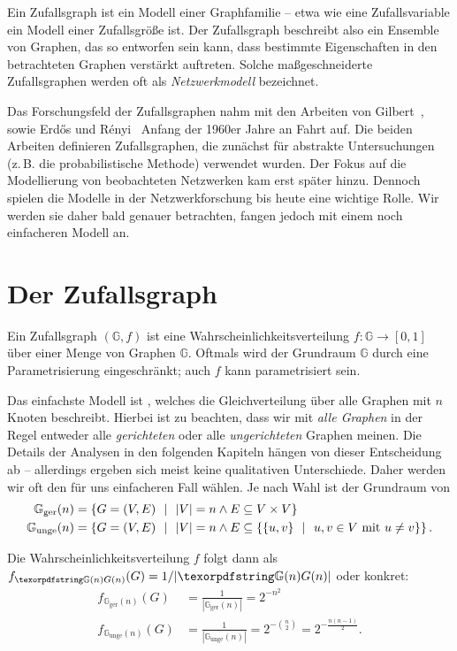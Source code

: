 Ein Zufallsgraph ist ein Modell einer Graphfamilie -- etwa wie eine Zufallsvariable ein Modell einer Zufallsgröße ist.
Der Zufallsgraph beschreibt also ein Ensemble von Graphen, das so entworfen sein kann, dass bestimmte Eigenschaften in den betrachteten Graphen verstärkt auftreten.
Solche maßgeschneiderte Zufallsgraphen werden oft als \emph{Netzwerkmodell} bezeichnet.

Das Forschungsfeld der Zufallsgraphen nahm mit den Arbeiten von Gilbert~\cite{gilbert_1959}, sowie Erd\H{o}s und R\'enyi~\cite{erdos_renyi_1960} Anfang der 1960er Jahre an Fahrt auf.
Die beiden Arbeiten definieren Zufallsgraphen, die zunächst für abstrakte Untersuchungen (z.\,B. die probabilistische Methode) verwendet wurden.
Der Fokus auf die Modellierung von beobachteten Netzwerken kam erst später hinzu.
Dennoch spielen die Modelle in der Netzwerkforschung bis heute eine wichtige Rolle.
Wir werden sie daher bald genauer betrachten, fangen jedoch mit einem noch einfacheren Modell an.

\section{Der Zufallsgraph \Gn}
Ein Zufallsgraph $(\mathbb G, f)$ ist eine Wahrscheinlichkeitsverteilung $f\colon \mathbb G \to [0, 1]$ über einer Menge von Graphen $\mathbb G$.
Oftmals wird der Grundraum $\mathbb G$ durch eine Parametrisierung eingeschränkt; auch $f$ kann parametrisiert sein.

Das  einfachste Modell ist \Gn, welches die Gleichverteilung über alle Graphen mit $n$ Knoten beschreibt.
Hierbei ist zu beachten, dass wir mit \emph{alle Graphen} in der Regel entweder alle \emph{gerichteten} oder alle \emph{ungerichteten} Graphen meinen.
Die Details der Analysen in den folgenden Kapiteln hängen von dieser Entscheidung ab -- allerdings ergeben sich meist keine qualitativen Unterschiede.
Daher werden wir oft den für uns einfacheren Fall wählen.
Je nach Wahl ist der Grundraum von \Gn
\begin{align}
    \mathbb G_\text{ger}(n)  & =
    \left\{ G = (V,E) \ \ \middle|\ \ |V| = n \land E \subseteq V \times V \right\} \\\label{eq:gerichtet_gn}
    \mathbb G_\text{unge}(n) & =
    \left\{ G = (V,E) \ \ \middle|\ \ |V| = n \land  E \subseteq \left\{ \left\{u,v\right\} \ \ \middle|\ \ u,v \in V \text{ mit } u \ne v \right\} \right\}.
\end{align}

\noindent Die Wahrscheinlichkeitsverteilung $f$ folgt dann als $f_{\gGn}(G) = 1 / | \gGn |$ oder konkret:
\begin{align}
    f_{\mathbb G_\text{ger}(n)}(G)  & =  \frac{1}{| \mathbb G_\text{ger}(n) |} = 2^{-n^2}\label{eq:gleichverteilt_gerichtet_gn} \\
    f_{\mathbb G_\text{unge}(n)}(G) & =  \frac{1}{| \mathbb G_\text{unge}(n) |} = 2^{-\binom n 2} = 2^{-\frac{n(n-1)}{2}}.
\end{align}

